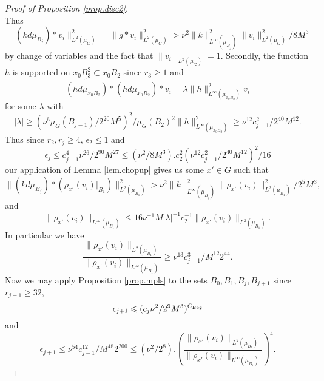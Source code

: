 \documentclass[12pt]{amsart}
\numberwithin{equation}{section}
\theoremstyle{plain}
\theoremstyle{definition}
\renewcommand{\leq}{\leqslant}
\renewcommand{\geq}{\geqslant}
\begin{document}
\begin{proof}[Proof of Proposition \ref{prop.disc2}]
\begin{equation*}
\end{equation*}
Thus
\begin{equation*}
\|(kd\mu_{B_j}) \ast v_i\|_{L^2(\mu_G)}^2= \|g \ast v_i\|_{L^2(\mu_G)}^2> \nu^2\|k\|_{L^\infty(\mu_{B_j})}^2\|v_i\|_{L^2(\mu_G)}^2/8M^3
\end{equation*}
by change of variables and the fact that $\|v_i\|_{L^2(\mu_G)}=1$.  Secondly, the function $h$ is supported on $x_0B_3^2 \subset x_0B_2$ since $r_3 \geq 1$ and
\begin{equation*}
\widetilde{(hd\mu_{x_0B_2})} \ast (hd\mu_{x_0B_2}) \ast v_i = \lambda \|h\|_{L^\infty(\mu_{x_0B_2})}^2v_i
\end{equation*}
for some $\lambda$ with
\begin{equation*}
|\lambda| \geq (\nu^6 \mu_G(B_{j-1})/2^{20}M^5)^2/\mu_G(B_2)^2\|h\|_{L^\infty(\mu_{x_0B_2})}^2 \geq \nu^{12}c_{j-1}^2/2^{40}M^{12}.
\end{equation*}
Thus since $r_2,r_j \geq 4$, $\epsilon_2 \leq 1$ and
\begin{equation*}
\epsilon_j \leq c_{j-1}^4\nu^{26}/2^{90}M^{27}\leq (\nu^2/8M^3).c_2^2(\nu^{12}c_{j-1}^2/2^{40}M^{12})^2/16
\end{equation*}
our application of Lemma \ref{lem.chopup} gives us some $x' \in G$ such that
\begin{equation*}
\|(kd\mu_{B_j}) \ast (\rho_{x'}(v_i)|_{B_1})\|_{L^2(\mu_{B_1})}^2 > \nu^2\|k\|_{L^\infty(\mu_{B_j})}^2\|\rho_{x'}(v_i)\|_{L^2(\mu_{B_1})}^2/2^5M^3,
\end{equation*}
and
\begin{equation*}
\|\rho_{x'}(v_i)\|_{L^\infty(\mu_{B_1})}\leq 16\nu^{-1}M|\lambda|^{-1}c_2^{-1}\|\rho_{x'}(v_i)\|_{L^2(\mu_{B_1})}.
\end{equation*}
In particular we have
\begin{equation*}
\frac{\|\rho_{x'}(v_i)\|_{L^2(\mu_{B_1})}}{\|\rho_{x'}(v_i)\|_{L^\infty(\mu_{B_1})} }\geq \nu^{13}c_{j-1}^3/M^{12}2^{44}.
\end{equation*}
Now we may apply Proposition \ref{prop.mpls} to the sets $B_0,B_1,B_j,B_{j+1}$ since $r_{j+1} \geq 32$,
\begin{equation*}
\epsilon_{j+1} \leq (c_j\nu^2/2^9M^3)^{C_{\rm{Bog}}}
\end{equation*}
and
\begin{equation*}
\epsilon_{j+1} \leq \nu^{54}c_{j-1}^{12}/M^{48}2^{200} \leq (\nu^2/2^8) .\left(\frac{\|\rho_{x'}(v_i)\|_{L^2(\mu_{B_1})}}{\|\rho_{x'}(v_i)\|_{L^\infty(\mu_{B_1})} }\right)^4.
\end{equation*}

\end{proof}
\end{document}
